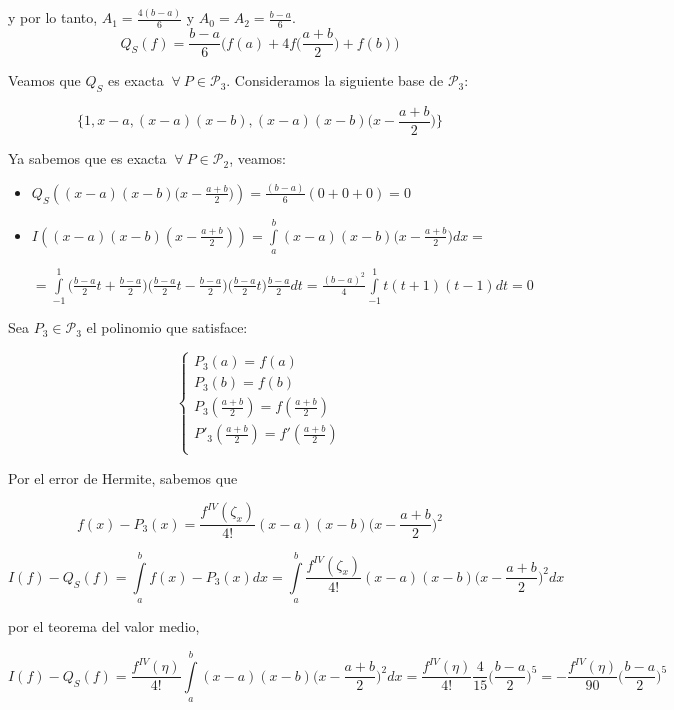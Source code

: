 y por lo tanto, $A_{1} = \frac{4(b - a)}{6}$ y $A_{0} = A_{2} = \frac{b - a}{6}$.\\

$$Q_{S}(f) = \frac{b - a}{6}\bigg(f(a) + 4f\bigg(\frac{a + b}{2} \bigg) + f(b)\bigg)$$

Veamos que $Q_{S}$ es exacta $\ \forall \ P \in \mathcal{P}_{3}$. Consideramos la siguiente base de $\mathcal{P}_{3}$: 

$$\{1, x - a, (x - a)(x - b), (x - a)(x - b)\bigg(x - \frac{a + b}{2} \bigg)\}$$

Ya sabemos que es exacta $\ \forall \ P \in \mathcal{P}_{2}$, veamos:

\begin{itemize}
	\item $Q_{S}((x - a)(x - b)\bigg(x - \frac{a + b}{2} \bigg)) = \frac{(b - a)}{6}(0 + 0 + 0) = 0$
	
	\item $I((x - a)(x - b)(x - \frac{a + b}{2})) = \int \limits_{a}^{b} (x - a)(x - b)\bigg(x - \frac{a + b}{2} \bigg) dx =$
	
	 $ = \int \limits_{-1}^{1} \bigg(\frac{b - a}{2}t + \frac{b - a}{2} \bigg)\bigg(\frac{b - a}{2}t - \frac{b - a}{2} \bigg)\bigg(\frac{b - a}{2}t \bigg)\frac{b - a}{2}dt = \frac{(b - a)^{2}}{4}\int \limits_{-1}^{1} t(t + 1)(t - 1)dt = 0$
\end{itemize}

Sea $P_{3} \in \mathcal{P}_{3}$ el polinomio que satisface:

$$
    \begin{cases}
        P_{3}(a) = f(a)\\
        P_{3}(b) = f(b)\\
        P_{3}(\frac{a + b}{2}) = f(\frac{a + b}{2})\\
        P'_{3}(\frac{a + b}{2}) = f'(\frac{a + b}{2})\\
    \end{cases}
$$

Por el error de Hermite, sabemos que

$$f(x) - P_{3}(x) = \frac{f^{IV}(\zeta_{x})}{4!}(x - a)(x - b)\bigg(x - \frac{a + b}{2} \bigg)^{2}$$

$$I(f) - Q_{S}(f) = \int \limits_{a}^{b} f(x) - P_{3}(x) dx = \int \limits_{a}^{b} \frac{f^{IV}(\zeta_{x})}{4!}(x - a)(x - b)\bigg(x - \frac{a + b}{2} \bigg)^{2} dx$$

por el teorema del valor medio,

$$I(f) - Q_{S}(f) = \frac{f^{IV}(\eta)}{4!}\int \limits_{a}^{b} (x - a)(x - b)\bigg(x - \frac{a + b}{2} \bigg)^{2} dx = \frac{f^{IV}(\eta)}{4!} \frac{4}{15} \bigg(\frac{b - a}{2}\bigg)^{5} = - \frac{f^{IV}(\eta)}{90}\bigg(\frac{b - a}{2}\bigg)^{5}$$\\ 

